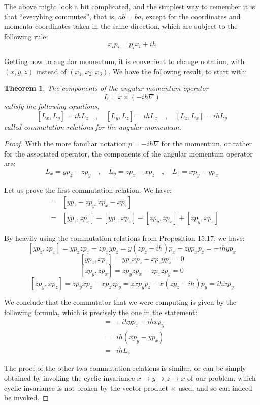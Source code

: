 \documentclass[12pt]{amsbook}
\newtheorem{theorem}{Theorem}[chapter]
\begin{document}
The above might look a bit complicated, and the simplest way to remember it is that ``everyhing commutes'', that is, $ab=ba$, except for the coordinates and momenta coordinates taken in the same direction, which are subject to the following rule:
$$x_ip_i=p_ix_i+ih$$

Getting now to angular momentum, it is convenient to change notation, with $(x,y,z)$ instead of $(x_1,x_2,x_3)$. We have the following result, to start with:

\begin{theorem}
The components of the angular momentum operator
$$L=x\times(-ih\nabla)$$
satisfy the following equations,
$$[L_x,L_y]=ihL_z\quad,\quad 
[L_y,L_z]=ihL_x\quad,\quad 
[L_z,L_x]=ihL_y$$
called commutation relations for the angular momentum.
\end{theorem}

\begin{proof}
With the more familiar notation $p=-ih\nabla$ for the momentum, or rather for the associated operator, the components of the angular momentum operator are:
$$L_x=yp_z-zp_y\quad,\quad 
L_y=zp_x-xp_z\quad,\quad
L_z=xp_y-yp_x$$

Let us prove the first commutation relation. We have:
\begin{eqnarray*}
[L_x,L_y]
&=&[yp_z-zp_y,zp_x-xp_z]\\
&=&[yp_z,zp_x]-[yp_z,xp_z]-[zp_y,zp_x]+[zp_y,xp_z]
\end{eqnarray*}

By heavily using the commutation relations from Proposition 15.17, we have:
$$[yp_z,zp_x]=yp_zzp_x-zp_xyp_z=y(zp_z-ih)p_x-zyp_xp_z=-ihyp_x$$
$$[yp_z,xp_z]=yp_zxp_z-xp_zyp_z=0$$
$$[zp_y,zp_x]=zp_yzp_x-zp_xzp_y=0$$
$$[zp_y,xp_z]=zp_yxp_z-xp_zzp_y=zxp_yp_z-x(zp_z-ih)p_y=ihxp_y$$

We conclude that the commutator that we were computing is given by the following formula, which is precisely the one in the statement:
\begin{eqnarray*}
[L_x,L_y]
&=&-ihyp_x+ihxp_y\\
&=&ih(xp_y-yp_x)\\
&=&ihL_z
\end{eqnarray*}

The proof of the other two commutation relations is similar, or can be simply obtained by invoking the cyclic invariance $x\to y\to z\to x$ of our problem, which cyclic invariance is not broken by the vector product $\times$ used, and so can indeed be invoked.
\end{proof}
\end{document}
